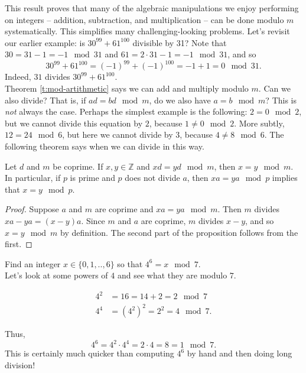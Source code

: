 \documentclass[11pt,dvipsnames]{book}
\numberwithin{figure}{section} %
\numberwithin{table}{section} %
\begin{document}
This result proves that many of the algebraic manipulations we enjoy performing on integers -- addition, subtraction, and multiplication -- can be done modulo $m$ systematically.
This simplifies many challenging-looking problems.
Let's revisit our earlier example: is $30^{99}+61^{100}$ divisible by 31?
Note that $30=31-1=-1\mod 31$ and $61=2\cdot 31-1=-1\mod 31$, and so
\[
30^{99}+61^{100} = (-1)^{99}+(-1)^{100}=-1+1=0 \mod 31.
\]
Indeed, $31$ divides $30^{99}+61^{100}$.\\

Theorem \ref{t:mod-artithmetic} says we can add and multiply modulo $m$. Can we also divide? That is, if $ad = bd\mod m$, do we also have $a = b\mod m$? This is \emph{not} always the case.
Perhaps the simplest example is the following: $2 = 0 \mod 2$, but we cannot divide this equation by $2$, because $1 \neq 0 \mod 2$.
More subtly, $12 = 24 \mod 6$, but here we cannot divide by $3$, because $4 \neq 8 \mod 6$.
The following theorem says when we can divide in this way.

\begin{proposition}
\label{p:xa=ya-x=a}
Let $d$ and $m$ be coprime. If $x,y\in \mathbb{Z}$ and $xd=yd\mod m$, then $x = y\mod m$.
In particular, if $p$ is prime and $p$ does not divide $a$, then $xa = ya\mod p$ implies that $x = y\mod p$.
\end{proposition}

\begin{proof}
Suppose $a$ and $m$ are coprime and $xa = ya\mod m$. Then $m$ divides $xa-ya=(x-y)a$. Since $m$ and $a$ are coprime, $m$ divides $x-y$, and so $x = y\mod m$ by definition. The second part of the proposition follows from the first.
\end{proof}

\begin{example}
Find an integer $x\in \{0,1,..,6\}$ so that $4^{6} = x\mod 7$. \\

Let's look at some powers of $4$ and see what they are modulo $ 7$.

\begin{align*}
4^2 & = 16 =14+2 = 2 \mod 7 \\
4^4 & = (4^2)^2  = 2^2 =4 \mod 7.
\end{align*}

Thus,
\[
4^6=4^2\cdot 4^4 = 2\cdot 4=8 = 1 \mod 7.
\]
This is certainly much quicker than computing $4^6$ by hand and then doing long division!
\end{example}
\end{document}
